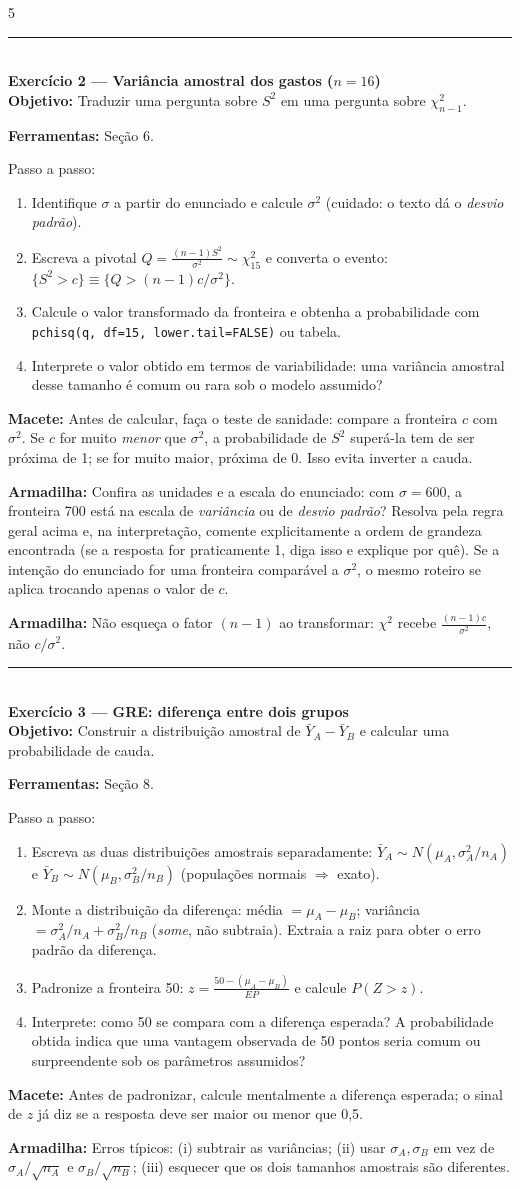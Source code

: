 \documentclass[a4paper,8pt]{extarticle}
\newcommand{\tit}[1]{\vspace{2pt}\textcolor{azul}{\rule{\linewidth}{0.6pt}}\\[1pt]\textbf{\textcolor{azul}{#1}}\\[1pt]}
\newcommand{\mac}[1]{\textcolor{verde}{\textbf{Macete:}} #1\par}
\newcommand{\arm}[1]{\textcolor{vinho}{\textbf{Armadilha:}} #1\par}
\newcommand{\ferr}[1]{\textbf{Ferramentas:} #1\par}
\newcommand{\obj}[1]{\textbf{Objetivo:} #1\par}
\newcommand{\R}[1]{\texttt{\footnotesize #1}}
\begin{document}
\begin{multicols*}{5}
\tit{Exercício 2 — Variância amostral dos gastos ($n=16$)}
\obj{Traduzir uma pergunta sobre $S^2$ em uma pergunta sobre $\chi^2_{n-1}$.}
\ferr{Seção 6.}
Passo a passo:
\begin{enumerate}
\item Identifique $\sigma$ a partir do enunciado e calcule $\sigma^2$ (cuidado: o texto dá o \emph{desvio padrão}).
\item Escreva a pivotal $Q=\frac{(n-1)S^2}{\sigma^2}\sim\chi^2_{15}$ e converta o evento: $\{S^2>c\}\equiv\{Q> (n-1)c/\sigma^2\}$.
\item Calcule o valor transformado da fronteira e obtenha a probabilidade com \R{pchisq(q, df=15, lower.tail=FALSE)} ou tabela.
\item Interprete o valor obtido em termos de variabilidade: uma variância amostral desse tamanho é comum ou rara sob o modelo assumido?
\end{enumerate}
\mac{Antes de calcular, faça o teste de sanidade: compare a fronteira $c$ com $\sigma^2$. Se $c$ for muito \emph{menor} que $\sigma^2$, a probabilidade de $S^2$ superá-la tem de ser próxima de 1; se for muito maior, próxima de 0. Isso evita inverter a cauda.}
\arm{Confira as unidades e a escala do enunciado: com $\sigma=600$, a fronteira 700 está na escala de \emph{variância} ou de \emph{desvio padrão}? Resolva pela regra geral acima e, na interpretação, comente explicitamente a ordem de grandeza encontrada (se a resposta for praticamente 1, diga isso e explique por quê). Se a intenção do enunciado for uma fronteira comparável a $\sigma^2$, o mesmo roteiro se aplica trocando apenas o valor de $c$.}
\arm{Não esqueça o fator $(n-1)$ ao transformar: $\chi^2$ recebe $\frac{(n-1)c}{\sigma^2}$, não $c/\sigma^2$.}

\tit{Exercício 3 — GRE: diferença entre dois grupos}
\obj{Construir a distribuição amostral de $\bar Y_A-\bar Y_B$ e calcular uma probabilidade de cauda.}
\ferr{Seção 8.}
Passo a passo:
\begin{enumerate}
\item Escreva as duas distribuições amostrais separadamente: $\bar Y_A\sim N(\mu_A,\sigma_A^2/n_A)$ e $\bar Y_B\sim N(\mu_B,\sigma_B^2/n_B)$ (populações normais $\Rightarrow$ exato).
\item Monte a distribuição da diferença: média $=\mu_A-\mu_B$; variância $=\sigma_A^2/n_A+\sigma_B^2/n_B$ (\emph{some}, não subtraia). Extraia a raiz para obter o erro padrão da diferença.
\item Padronize a fronteira 50: $z=\frac{50-(\mu_A-\mu_B)}{EP}$ e calcule $P(Z>z)$.
\item Interprete: como 50 se compara com a diferença esperada? A probabilidade obtida indica que uma vantagem observada de 50 pontos seria comum ou surpreendente sob os parâmetros assumidos?
\end{enumerate}
\mac{Antes de padronizar, calcule mentalmente a diferença esperada; o sinal de $z$ já diz se a resposta deve ser maior ou menor que 0,5.}
\arm{Erros típicos: (i) subtrair as variâncias; (ii) usar $\sigma_A,\sigma_B$ em vez de $\sigma_A/\sqrt{n_A}$ e $\sigma_B/\sqrt{n_B}$; (iii) esquecer que os dois tamanhos amostrais são diferentes.}


\end{multicols*}
\end{document}

